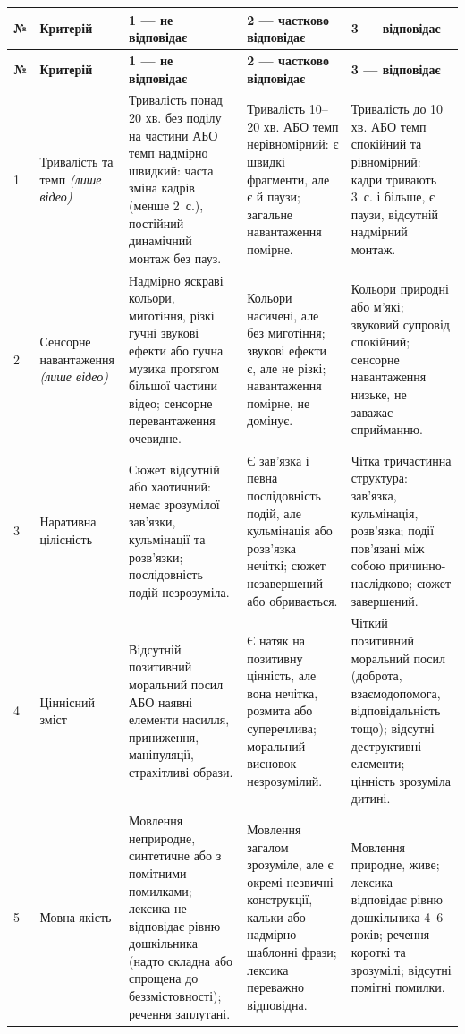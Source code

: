 \documentclass[14pt, a4paper]{extreport}
\begin{document}
\begingroup
\setlength{\tabcolsep}{4pt}
\small
\begin{longtable}{|p{0.4cm}|p{2.8cm}|p{3.4cm}|p{3.4cm}|p{3.4cm}|}
\hline
\textbf{№} & \textbf{Критерій} & \textbf{1 — не відповідає} & \textbf{2 — частково відповідає} & \textbf{3 — відповідає} \\
\hline
\endfirsthead
\hline
\textbf{№} & \textbf{Критерій} & \textbf{1 — не відповідає} & \textbf{2 — частково відповідає} & \textbf{3 — відповідає} \\
\hline
\endhead
1 & Тривалість та темп \newline\textit{(лише відео)} & Тривалість понад 20 хв. без поділу на частини АБО темп надмірно швидкий: часта зміна кадрів (менше 2~с.), постійний динамічний монтаж без пауз. & Тривалість 10--20 хв. АБО темп нерівномірний: є швидкі фрагменти, але є й паузи; загальне навантаження помірне. & Тривалість до 10 хв. АБО темп спокійний та рівномірний: кадри тривають 3~с. і більше, є паузи, відсутній надмірний монтаж. \\
\hline
2 & Сенсорне навантаження \newline\textit{(лише відео)} & Надмірно яскраві кольори, миготіння, різкі гучні звукові ефекти або гучна музика протягом більшої частини відео; сенсорне перевантаження очевидне. & Кольори насичені, але без миготіння; звукові ефекти є, але не різкі; навантаження помірне, не домінує. & Кольори природні або м'які; звуковий супровід спокійний; сенсорне навантаження низьке, не заважає сприйманню. \\
\hline
3 & Наративна цілісність & Сюжет відсутній або хаотичний: немає зрозумілої зав'язки, кульмінації та розв'язки; послідовність подій незрозуміла. & Є зав'язка і певна послідовність подій, але кульмінація або розв'язка нечіткі; сюжет незавершений або обривається. & Чітка тричастинна структура: зав'язка, кульмінація, розв'язка; події пов'язані між собою причинно-наслідково; сюжет завершений. \\
\hline
4 & Ціннісний зміст & Відсутній позитивний моральний посил АБО наявні елементи насилля, приниження, маніпуляції, страхітливі образи. & Є натяк на позитивну цінність, але вона нечітка, розмита або суперечлива; моральний висновок незрозумілий. & Чіткий позитивний моральний посил (доброта, взаємодопомога, відповідальність тощо); відсутні деструктивні елементи; цінність зрозуміла дитині. \\
\hline
5 & Мовна якість & Мовлення неприродне, синтетичне або з помітними помилками; лексика не відповідає рівню дошкільника (надто складна або спрощена до беззмістовності); речення заплутані. & Мовлення загалом зрозуміле, але є окремі незвичні конструкції, кальки або надмірно шаблонні фрази; лексика переважно відповідна. & Мовлення природне, живе; лексика відповідає рівню дошкільника 4--6 років; речення короткі та зрозумілі; відсутні помітні помилки. \\

\end{longtable}
\end{document}
